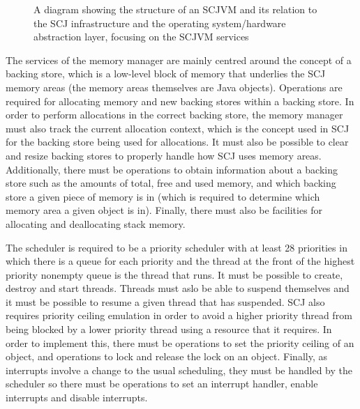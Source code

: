 \documentclass[a4paper,10pt]{report}
\begin{document}
\begin{figure}[ht]
  \caption{A diagram showing the structure of an SCJVM and its
    relation to the SCJ infrastructure and the operating
    system/hardware abstraction layer, focusing on the SCJVM services}
  \label{scjvm-services-fig}
\end{figure}

The services of the memory manager are mainly centred around the
concept of a backing store, which is a low-level block of memory that
underlies the SCJ memory areas (the memory areas themselves are Java
objects).
Operations are required for allocating memory and new backing stores
within a backing store.
In order to perform allocations in the correct backing store, the
memory manager must also track the current allocation context, which
is the concept used in SCJ for the backing store being used for
allocations.
It must also be possible to clear and resize backing stores to
properly handle how SCJ uses memory areas.
Additionally, there must be operations to obtain information about a
backing store such as the amounts of total, free and used memory, and
which backing store a given piece of memory is in (which is required
to determine which memory area a given object is in).
Finally, there must also be facilities for allocating and deallocating
stack memory.

The scheduler is required to be a priority scheduler with at least 28
priorities in which there is a queue for each priority and the thread
at the front of the highest priority nonempty queue is the thread that
runs.
It must be possible to create, destroy and start threads.
Threads must aslo be able to suspend themselves and it must be
possible to resume a given thread that has suspended.
SCJ also requires priority ceiling emulation in order to avoid a
higher priority thread from being blocked by a lower priority thread
using a resource that it requires.
In order to implement this, there must be operations to set the
priority ceiling of an object, and operations to lock and release the
lock on an object.
Finally, as interrupts involve a change to the usual scheduling, they
must be handled  by the scheduler so there must be operations to set
an interrupt handler, enable interrupts and disable interrupts.
\end{document}
